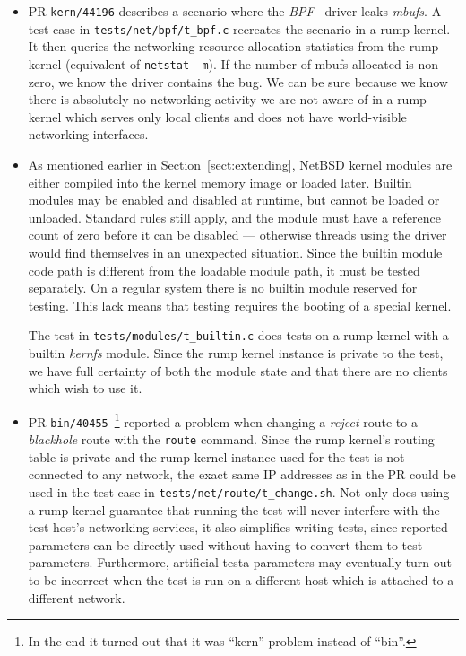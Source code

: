 \begin{itemize}
\item   PR \texttt{kern/44196} describes a scenario where the
	\textit{BPF}~\cite{mccanne:bpf} driver leaks \textit{mbufs}.
	A test case in \verb+tests/net/bpf/t_bpf.c+ recreates the
	scenario in a rump kernel.  It then queries the networking
	resource allocation statistics from the rump kernel
	(equivalent of \texttt{netstat~-m}).  If the number of
	mbufs allocated is non-zero, we know the driver contains
	the bug.  We can be sure because we know there is absolutely
	no networking activity we are not aware of in a rump kernel
	which serves only local clients and does not have world-visible
	networking interfaces.

\item   As mentioned earlier in Section~\ref{sect:extending}, NetBSD
	kernel modules are either compiled into the kernel memory
	image or loaded later.  Builtin modules may be enabled and
	disabled at runtime, but cannot be loaded or unloaded.
	Standard rules still apply, and the module must have a
	reference count of zero before it can be disabled ---
	otherwise threads using the driver would find themselves
	in an unexpected situation.  Since the builtin module code
	path is different from the loadable module path, it must
	be tested separately.  On a regular system there is no
	builtin module reserved for testing.  This lack means that
	testing requires the booting of a special kernel.

	The test in \verb+tests/modules/t_builtin.c+ does tests on
	a rump kernel with a builtin \textit{kernfs} module.  Since
	the rump kernel instance is private to the test, we have
	full certainty of both the module state and that there are
	no clients which wish to use it.

\item   PR \texttt{bin/40455}~\footnote
{
	In the end it turned out that it was ``kern'' problem
	instead of ``bin''.
}
	reported a problem when changing a \textit{reject} route
	to a \textit{blackhole} route with the \texttt{route}
	command.  Since the rump kernel's routing table is private
	and the rump kernel instance used for the test is not
	connected to any network, the exact same IP addresses as
	in the PR could be used in the test case in
	\verb+tests/net/route/t_change.sh+.  Not only does using
	a rump kernel guarantee that running the test will never
	interfere with the test host's networking services, it also
	simplifies writing tests, since reported parameters can be
	directly used without having to convert them to test
	parameters.  Furthermore, artificial testa parameters may
	eventually turn out to be incorrect when the test is run on a
	different host which is attached to a different network.


\end{itemize}
